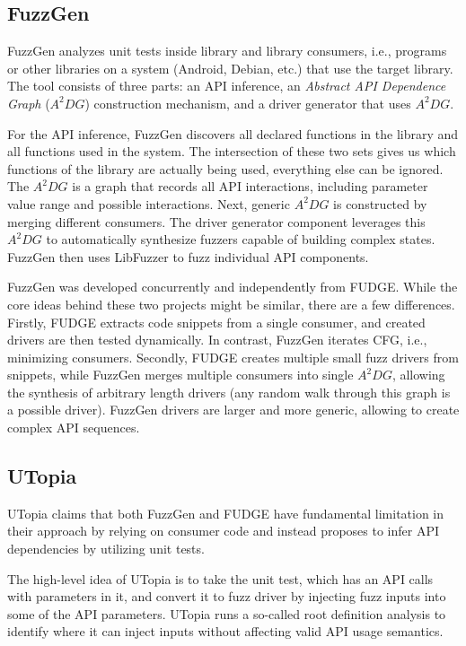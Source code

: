 \documentclass[a4paper,11pt,oneside]{report}
\begin{document}
\subsection{FuzzGen}
FuzzGen analyzes unit tests inside library and library consumers, 
i.e., programs or other libraries on a system (Android, Debian, etc.) 
that use the target library. The tool consists of three parts: an 
API inference, an \emph{Abstract API Dependence Graph} ($A^{2}DG$)
construction mechanism, and a driver generator that uses $A^{2}DG$. 

For the API inference, FuzzGen discovers all declared functions
in the library and all functions used in the system. The intersection
of these two sets gives us which functions of the library
are actually being used, everything else can be ignored.
The $A^{2}DG$ is a graph that records all API interactions, 
including parameter value range and possible interactions. 
Next, generic $A^{2}DG$ is constructed by merging different consumers.
The driver generator component leverages this $A^{2}DG$ 
to automatically synthesize fuzzers capable of building complex states.
FuzzGen then uses LibFuzzer to fuzz individual API components.

FuzzGen was developed concurrently and independently from FUDGE. 
While the core ideas behind these two projects might be similar, 
there are a few differences. Firstly, FUDGE extracts code snippets 
from a single consumer, and created drivers are then
tested dynamically. In contrast, FuzzGen iterates CFG, i.e., minimizing 
consumers. Secondly, FUDGE creates multiple small fuzz drivers from snippets,
while FuzzGen merges multiple consumers into single
$A^{2}DG$, allowing the synthesis of arbitrary length drivers 
(any random walk through this graph is a possible driver). 
FuzzGen drivers are larger and more generic, allowing 
to create complex API sequences.

\subsection{UTopia}
UTopia claims that both FuzzGen and FUDGE have fundamental 
limitation in their approach by relying on consumer code and instead
proposes to infer API dependencies by utilizing unit tests. 

The high-level idea of UTopia is to take the unit test, which has an API
calls with parameters in it, and convert it to fuzz driver by injecting 
fuzz inputs into some of the API parameters. UTopia runs a 
so-called root definition analysis to identify where it can 
inject inputs without affecting valid API usage semantics.
\end{document}
